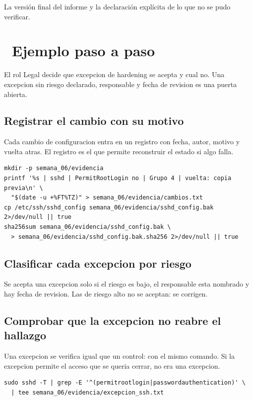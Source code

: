 \documentclass[11pt,a4paper]{article}
\newcommand{\iconotexto}[2]{\textcolor{cyanNeon}{\faIcon{#1}}~#2}
\begin{document}
La versión final del informe y la declaración explícita de lo que no se pudo verificar.

\section{\iconotexto{list-ol}{Ejemplo paso a paso}}

El rol Legal decide que excepcion de hardening se acepta y cual no. Una excepcion sin riesgo declarado, responsable y fecha de revision es una puerta abierta.

\subsection{Registrar el cambio con su motivo}

Cada cambio de configuracion entra en un registro con fecha, autor, motivo y vuelta atras. El registro es el que permite reconstruir el estado si algo falla.

\begin{lstlisting}[style=estiloCodigo]
mkdir -p semana_06/evidencia
printf '%s | sshd | PermitRootLogin no | Grupo 4 | vuelta: copia previa\n' \
  "$(date -u +%FT%TZ)" > semana_06/evidencia/cambios.txt
cp /etc/ssh/sshd_config semana_06/evidencia/sshd_config.bak 2>/dev/null || true
sha256sum semana_06/evidencia/sshd_config.bak \
  > semana_06/evidencia/sshd_config.bak.sha256 2>/dev/null || true
\end{lstlisting}

\subsection{Clasificar cada excepcion por riesgo}

Se acepta una excepcion solo si el riesgo es bajo, el responsable esta nombrado y hay fecha de revision. Las de riesgo alto no se aceptan: se corrigen.

\subsection{Comprobar que la excepcion no reabre el hallazgo}

Una excepcion se verifica igual que un control: con el mismo comando. Si la excepcion permite el acceso que se queria cerrar, no era una excepcion.

\begin{lstlisting}[style=estiloCodigo]
sudo sshd -T | grep -E '^(permitrootlogin|passwordauthentication)' \
  | tee semana_06/evidencia/excepcion_ssh.txt
\end{lstlisting}
\end{document}
